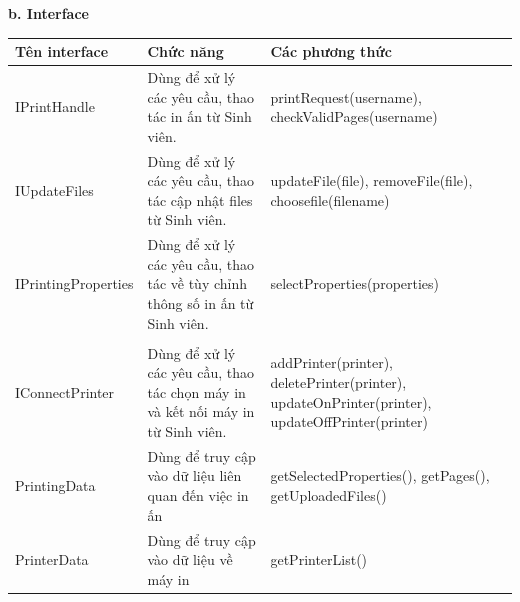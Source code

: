\documentclass[a4paper]{article}
\begin{document}
\noindent \textbf{b. Interface}
\begin{table}[h!]
\centering
\begin{tabular}{|M{3cm}|p{6cm}|p{5.5cm}|}
\hline
\textbf{Tên interface} & \textbf{Chức năng} & \textbf{Các phương thức} \\
\hline
IPrintHandle & Dùng để xử lý các yêu cầu, thao tác in ấn từ Sinh viên. &  printRequest(username), checkValidPages(username)\\
\hline
IUpdateFiles & Dùng để xử lý các yêu cầu, thao tác cập nhật files từ Sinh viên. &  updateFile(file), removeFile(file), choosefile(filename) \\
\hline
IPrintingProperties & Dùng để xử lý các yêu cầu, thao tác về tùy chỉnh thông số in ấn từ Sinh viên. & selectProperties(properties) \\
& &  \\
\hline
IConnectPrinter & Dùng để xử lý các yêu cầu, thao tác chọn máy in và kết nối máy in từ Sinh viên. &  addPrinter(printer), deletePrinter(printer), updateOnPrinter(printer), updateOffPrinter(printer)\\
\hline
PrintingData & Dùng để truy cập vào dữ liệu liên quan đến việc in ấn & getSelectedProperties(), getPages(), getUploadedFiles() \\
PrinterData & Dùng để truy cập vào dữ liệu về máy in & getPrinterList() \\
\hline
\end{tabular}
\end{table}








\end{document}
